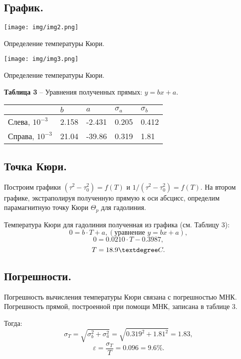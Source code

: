 \documentclass[12pt,a4paper]{article}
\begin{document}
    \subsection{График.}
        \begin{center}
            \texttt{[image: img/img2.png]}
            
            Определение температуры Кюри.
        \end{center}
        \begin{center}
            \texttt{[image: img/img3.png]}
            
            Определение температуры Кюри.
        \end{center}
        \begin{table}[!h]
            \begin{flushleft}%
           		\textbf{Таблица 3} -- Уравнения полученных прямых: $y = bx + a$.\\
            \end{flushleft}
            \begin{center}
                \begin{tabular}{ | l | l | l | l | l |}
                    \hline
                        &   $b$   &   $a$   &   $\sigma_a$   &   $\sigma_b$ \\
                    \hline
                    Слева, $10^{-3}$   &   2.158   &   -2.431  &   0.205   &   0.412   \\
                    \hline
                    Справа, $10^{-3}$  &   21.04   &   -39.86  &   0.319   &   1.81    \\
                    \hline
                \end{tabular}
            \end{center}
        \end{table}
\newpage
    \subsection{Точка Кюри.}
        Построим графики $(\tau^2 - \tau_0^2) = f(T)$ и $1/(\tau^2 - \tau_0^2) = f(T)$. На втором графике, экстраполируя полученную прямую к оси абсцисс, определим парамагнитную точку Кюри $\Theta_p$ для гадолиния.
        
        Температура Кюри для гадолиния полученная из графика (см. Таблицу 3): 
        \[
        0 = b\cdot T + a, (\text{уравнение } y = bx + a),
        \]
        \[
        0 = 0.0210\cdot T - 0.3987,
        \]
        \[
        T = 18.9 \textdegree C.
        \]
    \subsection{Погрешности.}
        Погрешность вычисления температуры Кюри связана с погрешностью МНК.
        Погрешность прямой, построенной при помощи МНК, записана в таблице 3.
        
        Тогда:
        \[
        \sigma_T = \sqrt{\sigma_b^2 + \sigma_a^2} = \sqrt{0.319^2 + 1.81^2} = 1.83,
        \]
        \[
        \varepsilon = \dfrac{\sigma_T}{T} = 0.096 = 9.6\%.
        \]
\end{document}
